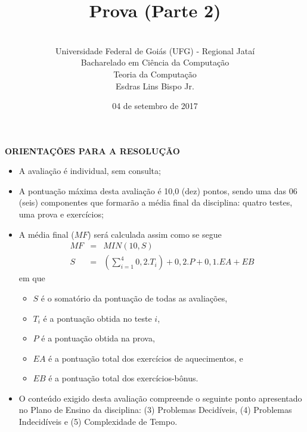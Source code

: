 \documentclass[12pt,a4paper,oneside]{article}
\author{\\Universidade Federal de Goiás (UFG) - Regional  Jataí\\Bacharelado em Ciência da Computação \\Teoria da Computação \\Esdras Lins Bispo Jr.}
\date{04 de setembro de 2017}
\title{\sc \huge Prova (Parte 2)}
\begin{document}
\maketitle

{\bf ORIENTAÇÕES PARA A RESOLUÇÃO}

\small
 
\begin{itemize}
	\item A avaliação é individual, sem consulta;
	\item A pontuação máxima desta avaliação é 10,0 (dez) pontos, sendo uma das 06 (seis) componentes que formarão a média final da disciplina: quatro testes, uma prova e exercícios;
	\item A média final ($MF$) será calculada assim como se segue
	\begin{eqnarray}
		MF & = & MIN(10, S) \nonumber \\
		S & = & (\sum_{i=1}^{4} 0,2.T_i ) + 0,2.P  + 0,1.EA + EB\nonumber
	\end{eqnarray}
	em que 
	\begin{itemize}
		\item $S$ é o somatório da pontuação de todas as avaliações,
		\item $T_i$ é a pontuação obtida no teste $i$,
		\item $P$ é a pontuação obtida na prova,
		\item $EA$ é a pontuação total dos exercícios de aquecimentos, e
		\item $EB$ é a pontuação total dos exercícios-bônus.
	\end{itemize}
	\item O conteúdo exigido desta avaliação compreende o seguinte ponto apresentado no Plano de Ensino da disciplina: (3) Problemas Decidíveis, (4) Problemas Indecidíveis e (5) Complexidade de Tempo.
\end{itemize}

\begin{center}
\end{center}

\newpage
\end{document}
